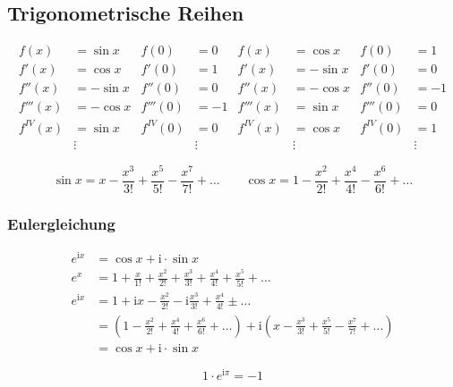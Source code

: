 \subsection{Trigonometrische Reihen}

\begin{align*}
	f(x)      & =\sin x  & f(0)      & =0     & f(x)      & = \cos x  & f(0)      & = 1    \\
	f'(x)     & =\cos x  & f'(0)     & =1     & f'(x)     & = -\sin x & f'(0)     & = 0    \\
	f''(x)    & =-\sin x & f''(0)    & =0     & f''(x)    & = -\cos x & f''(0)    & = -1   \\
	f'''(x)   & =-\cos x & f'''(0)   & =-1    & f'''(x)   & = \sin x  & f'''(0)   & = 0    \\
	f^{IV}(x) & =\sin x  & f^{IV}(0) & =0     & f^{IV}(x) & = \cos x  & f^{IV}(0) & = 1    \\
	          & \vdots   &           & \vdots &           & \vdots    &           & \vdots
\end{align*}

\[
	\sin x = x - \frac{x^3}{3!} + \frac{x^5}{5!} - \frac{x^7}{7!} + \ldots \qquad
	\cos x = 1 - \frac{x^2}{2!} + \frac{x^4}{4!} - \frac{x^6}{6!} + \ldots
\]

\subsubsection{Eulergleichung}

\begin{align*}
	e^{\mathrm{i}x} & = \cos x + \mathrm{i} \cdot \sin x                                                                                                                                       \\
	e^x             & = 1 + \frac{x}{1!} + \frac{x^2}{2!} + \frac{x^3}{3!} + \frac{x^4}{4!}  + \frac{x^5}{5!} + \ldots                                                                         \\
	e^{\mathrm{i}x} & = 1 + \mathrm{i} x - \frac{x^2}{2!} - \mathrm{i} \frac{x^3}{3!} + \frac{x^4}{4!} \pm \ldots                                                                              \\
	                & = \left( 1 - \frac{x^2}{2!} + \frac{x^4}{4!} + \frac{x^6}{6!} + \ldots \right) + \mathrm{i} \left( x - \frac{x^3}{3!} + \frac{x^5}{5!} - \frac{x^7}{7!} + \ldots \right) \\
	                & = \cos x + \mathrm{i} \cdot \sin x
\end{align*}

\begin{gesetz}
	\[
		1 \cdot e^{\mathrm{i} \pi} = -1
	\]
\end{gesetz}
